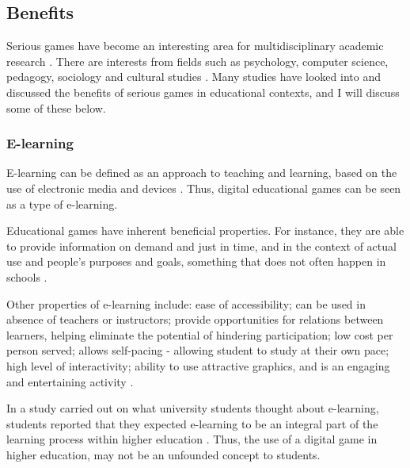 \documentclass[a4paper,11.5pt]{report}
\numberwithin{figure}{section}
\numberwithin{table}{section}
\numberwithin{equation}{section}
\numberwithin{equation}{section}
\begin{document}

\subsection{Benefits}

Serious games have become an interesting area for multidisciplinary academic research \citep{Breuer2010}. There are interests from fields such as psychology, computer science, pedagogy, sociology and cultural studies \citep{Breuer2010}. Many studies have looked into and discussed the benefits of serious games in educational contexts, and I will discuss some of these below.

\subsubsection{E-learning}

E-learning can be defined as an approach to teaching and learning, based on the use of electronic media and devices \citep{sangra2012}. Thus, digital educational games can be seen as a type of e-learning.

Educational games have inherent beneficial properties. For instance, they are able to provide information on demand and just in time, and in the context of actual use and people's purposes and goals, something that does not often happen in schools \citep{Gee2003}.

Other properties of e-learning include: ease of accessibility; can be used in absence of teachers or instructors; provide opportunities for relations between learners, helping eliminate the potential of hindering participation; low cost per person served; allows self-pacing - allowing student to study at their own pace; high level of interactivity; ability to use attractive graphics, and is an engaging and entertaining activity \citep{arkorful2015, Girard2013}.

In a study carried out on what university students thought about e-learning, students reported that they expected e-learning to be an integral part of the learning process within higher education \citep{Connolly2012}. Thus, the use of a digital game in higher education, may not be an unfounded concept to students.
\end{document}
